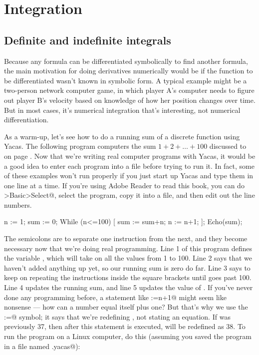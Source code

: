 \chapter{Integration}\label{ch:integration}

\section{Definite and indefinite integrals}

Because any formula can be differentiated symbolically to find another formula,
the main motivation for doing derivatives numerically would be if the function to be
differentiated wasn't known in symbolic form.
A typical example might be a two-person network computer game, in which player A's
computer needs to figure out player B's velocity based on knowledge of how her
position changes over time. But in most cases, it's numerical integration that's
interesting, not numerical differentiation.

As a warm-up, let's see how to do a running sum of a discrete function using Yacas.
The following program computers the sum $1+2+\ldots+100$ discussed to on page
\pageref{gauss-story}. Now that we're writing real computer programs with Yacas, it would be a good
idea to enter each program into a file before trying to run it. In fact, some
of these examples won't run properly if you just start up Yacas and type them in
one line at a time. If you're using Adobe Reader to read this book, you can
do \verb@Tools>Basic>Select@, select the program, copy it into a file,
and then edit out the line numbers.

\restartLineNumbers
\begin{eg}
\startcodeeg
\begin{Code}
  \nn n := 1;
  \nn sum := 0;
  \nn While (n<=100) [
  \nn   sum := sum+n;
  \nn   n := n+1;
  \nn ];
  \nn Echo(sum);
\end{Code}
\end{eg}

The semicolons are to separate one instruction from the next, and they become necessary
now that we're doing real programming.
Line 1 of this program defines the variable \verb@n@, which will take on all the values
from 1 to 100. Line 2 says that we haven't added anything up yet, so our running
sum is zero do far. Line 3 says to keep on repeating the instructions inside the
square brackets until \verb@n@ goes past 100. Line 4 updates the running sum, and
line 5 updates the value of \verb@n@. If you've never done any programming before,
a statement like \verb@n:=n+1@ might seem like nonsense --- how can a number equal
itself plus one? But that's why we use the \verb@:=@ symbol; it says that we're redefining
\verb@n@, not stating an equation. If \verb@n@ was previously 37, then after this statement is
executed, \verb@n@ will be redefined as 38.
To run the program on a Linux computer,
do this (assuming you saved the program in a file named \verb@sum.yacas@):

